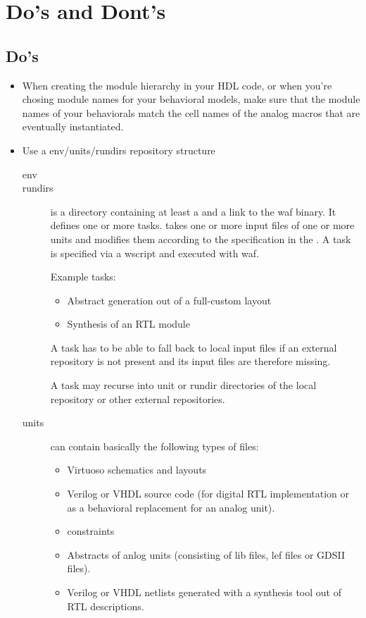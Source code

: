 \chapter{Do's and Dont's}
\section{Do's}
\begin{itemize}
    \item When creating the module hierarchy in your HDL code, or when you're chosing module names for your behavioral models, make sure that the module names of your behaviorals match the cell names of the analog macros that are eventually instantiated.
    \item Use a env/units/rundirs repository structure
 \begin{description}
    \item[env]
	\item[rundirs]
		is a directory containing at least a  and a link to the waf binary. It defines one or more tasks.
		takes one or more input files of one or more units and modifies them
		according to the specification in the .
		A task is specified via a wscript and executed with waf.

		Example tasks:
		\begin{itemize}
			\item Abstract generation out of a full-custom layout 
			\item Synthesis of an RTL module
		\end{itemize}

		A task has to be able to fall back to local input files if an external repository is not present and its input files are therefore missing.

		A task may recurse into unit or rundir directories of the local repository or other external repositories.

	\item[units]
		can contain basically the following types of files:
		\begin{itemize}
			\item Virtuoso schematics and layouts
			\item Verilog or VHDL source code (for digital RTL implementation or as a behavioral replacement for an analog unit).
			\item constraints
			\item Abstracts of anlog units (consisting of lib files, lef files or GDSII files).
			\item Verilog or VHDL netlists generated with a synthesis tool out of RTL descriptions.
		\end{itemize}


\end{description}
\end{itemize}

